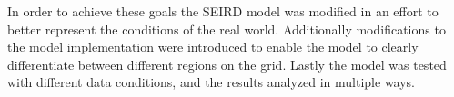 In order to achieve these goals the SEIRD model was modified in an effort to better represent the conditions of the real world.
Additionally modifications to the model implementation were introduced to enable the model to clearly differentiate between different
regions on the grid. Lastly the model was tested with different data conditions, and the results analyzed in multiple ways.




